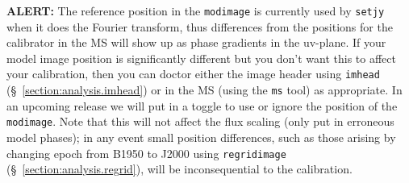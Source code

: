 {\bf ALERT:} The reference position in the {\tt modimage} is 
currently used by {\tt setjy} when it does the Fourier transform,
thus differences from the positions for the calibrator in the MS
will show up as phase gradients in the uv-plane.  If your model
image position is significantly different but you don't want this
to affect your calibration, then you can doctor either the image
header using {\tt imhead} (\S~\ref{section:analysis.imhead})
or in the MS (using the {\tt ms} tool) as appropriate.  In an upcoming
release we will put in a toggle to use or ignore the position of
the {\tt modimage}.  Note that this will not affect the flux scaling
(only put in erroneous model phases); in any event small position
differences, such as those arising by changing epoch from B1950 to
J2000 using {\tt regridimage} (\S~\ref{section:analysis.regrid}),
will be inconsequential to the calibration.

